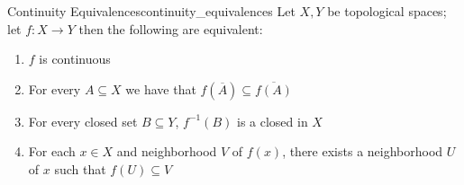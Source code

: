 \begin{proposition}{Continuity Equivalences}{continuity_equivalences}
Let \( X, Y \) be topological spaces; let \( f : X \to Y \) then the following
are equivalent:
\begin{enumerate}
    \item \( f \) is continuous
    \item For every \( A \subseteq X \) we have that \( f\left( \overline{A}
    \right) \subseteq \overline{f\left( A \right) }  \) 
    \item For every closed set \( B \subseteq Y  \), \( f ^{-1} \left( B \right)
    \) is a closed in \( X \) 
    \item For each \( x \in  X \) and neighborhood \( V \) of \( f\left( x
    \right)  \), there exists a neighborhood \( U \) of \( x \) such that \(
    f\left( U \right) \subseteq V \) 
\end{enumerate}
\end{proposition}
